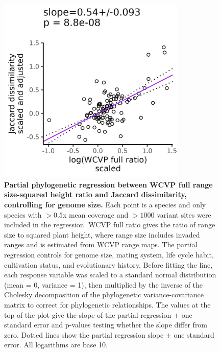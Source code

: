 \documentclass[12pt]{article}
\begin{document}
\begin{figure}[H]
    \centering
    \includegraphics[width=0.8\textwidth]{figures/appendix_d/wcvp_all_popsize_vs_jac_genome-size-corrected_2024-12-12.jpg}
    \caption{\textbf{Partial phylogenetic regression between WCVP full range size-squared height ratio and Jaccard dissimilarity, controlling for genome size.} Each point is a species and only species with $>0.5$x mean coverage and $>1000$ variant sites were included in the regression. WCVP full ratio gives the ratio of range size to squared plant height, where range size includes invaded ranges and is estimated from WCVP range maps. The partial regression controls for genome size, mating system, life cycle habit, cultivation status, and evolutionary history. Before fitting the line, each response variable was scaled to a standard normal distribution (mean = 0, variance = 1), then multiplied by the inverse of the Cholesky decomposition of the phylogenetic variance-covariance matrix to correct for phylogenetic relationships. The values at the top of the plot give the slope of the partial regression $\pm$ one standard error and p-values testing whether the slope differ from zero. Dotted lines show the partial regression slope $\pm$ one standard error. All logarithms are base 10.}
\end{figure}
\end{document}
